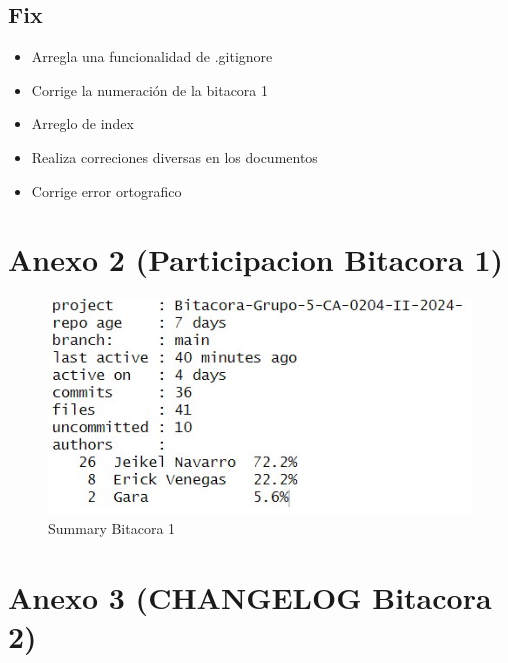 \documentclass[
  letterpaper,
  DIV=11,
  numbers=noendperiod]{scrreprt}
\providecommand{\tightlist}{%
  \setlength{\itemsep}{0pt}\setlength{\parskip}{0pt}}\usepackage{longtable,booktabs,array}
\begin{document}
\subsection{Fix}\label{fix}

\begin{itemize}
\tightlist
\item
  Arregla una funcionalidad de .gitignore
\item
  Corrige la numeración de la bitacora 1
\item
  Arreglo de index
\item
  Realiza correciones diversas en los documentos
\item
  Corrige error ortografico
\end{itemize}

\section{Anexo 2 (Participacion Bitacora
1)}\label{anexo-2-participacion-bitacora-1}

\begin{figure}[H]

{\centering \includegraphics{imagenes/summary_1.jpeg}

}

\caption{Summary Bitacora 1}

\end{figure}%

\section{Anexo 3 (CHANGELOG Bitacora
2)}\label{anexo-3-changelog-bitacora-2}
\end{document}
